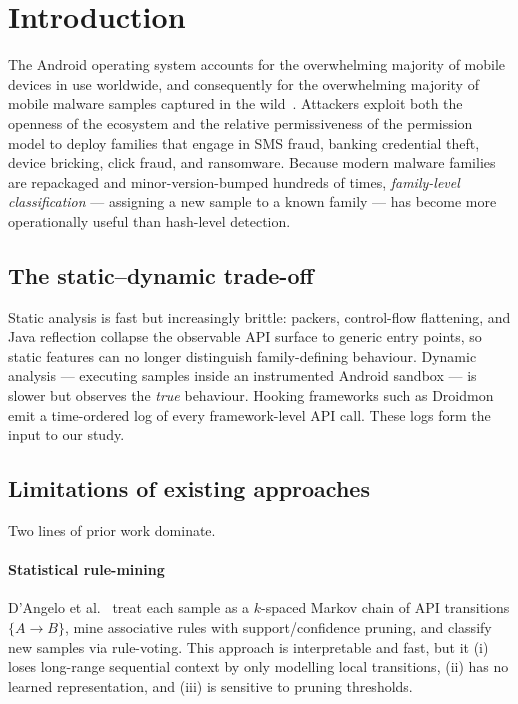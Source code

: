 \section{Introduction}
\label{sec:introduction}

The Android operating system accounts for the overwhelming majority of
mobile devices in use worldwide, and consequently for the overwhelming
majority of mobile malware samples captured in
the wild~\cite{alswaina2020android,kaspersky2023mobile}. Attackers
exploit both the openness of the ecosystem and the relative permissiveness
of the permission model to deploy families that engage in SMS fraud,
banking credential theft, device bricking, click fraud, and ransomware.
Because modern malware families are repackaged and minor-version-bumped
hundreds of times, \emph{family-level classification} — assigning a
new sample to a known family — has become more operationally useful
than hash-level detection.

\subsection{The static--dynamic trade-off}

Static analysis is fast but increasingly brittle: packers, control-flow
flattening, and Java reflection collapse the observable API surface to
generic entry points, so static features can no longer distinguish
family-defining behaviour. Dynamic analysis — executing samples inside an
instrumented Android sandbox — is slower but observes the \emph{true}
behaviour. Hooking frameworks such as Droidmon emit a
time-ordered log of every framework-level API call. These logs form the
input to our study.

\subsection{Limitations of existing approaches}

Two lines of prior work dominate.

\paragraph{Statistical rule-mining} D'Angelo et al.~\cite{dangelo2023association}
treat each sample as a $k$-spaced Markov chain of API transitions
$\{A \rightarrow B\}$, mine associative rules with
support/confidence pruning, and classify new samples via
rule-voting. This approach is interpretable and fast, but it (i) loses
long-range sequential context by only modelling local transitions,
(ii) has no learned representation, and (iii) is sensitive to pruning
thresholds.

